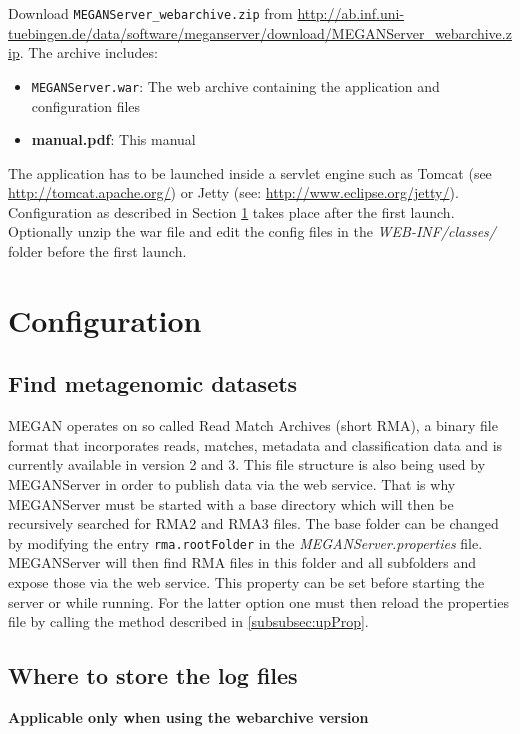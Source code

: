 \documentclass[11pt]{article}
\begin{document}
Download \texttt{MEGANServer\_webarchive.zip} from \url{http://ab.inf.uni-tuebingen.de/data/software/meganserver/download/MEGANServer\_webarchive.zip}. The archive includes:

\begin{itemize}
\item \texttt{MEGANServer.war}: The web archive containing the application and configuration files
\item \textbf{manual.pdf}: This manual
\end{itemize}


The application has to be launched inside a servlet engine such as Tomcat (see \url{http://tomcat.apache.org/}) or Jetty (see: \url{http://www.eclipse.org/jetty/}). Configuration as described in Section \ref{sec:config} takes place after the first launch. Optionally unzip the war file and edit the config files in the \textit{WEB-INF/classes/} folder before the first launch.

\section{Configuration}
\label{sec:config}

\subsection{Find metagenomic datasets}
\label{subsec:props}

MEGAN operates on so called Read Match Archives (short RMA), a binary file format that incorporates reads, matches, metadata and classification data and is currently available in version 2 and 3. This file structure is also being used by MEGANServer in order to publish data via the web service. That is why MEGANServer must be started with a base directory which will then be recursively searched for RMA2 and RMA3 files.
The base folder can be changed by modifying the entry \texttt{rma.rootFolder} in the \textit{MEGANServer.properties} file. MEGANServer will then find RMA files in this folder and all subfolders and expose those via the web service. This property can be set before starting the server or while running. For the latter option one must then reload the properties file by calling the method described in \ref{subsubsec:upProp}.


\subsection{Where to store the log files}
\textbf{Applicable only when using the webarchive version}
\end{document}
